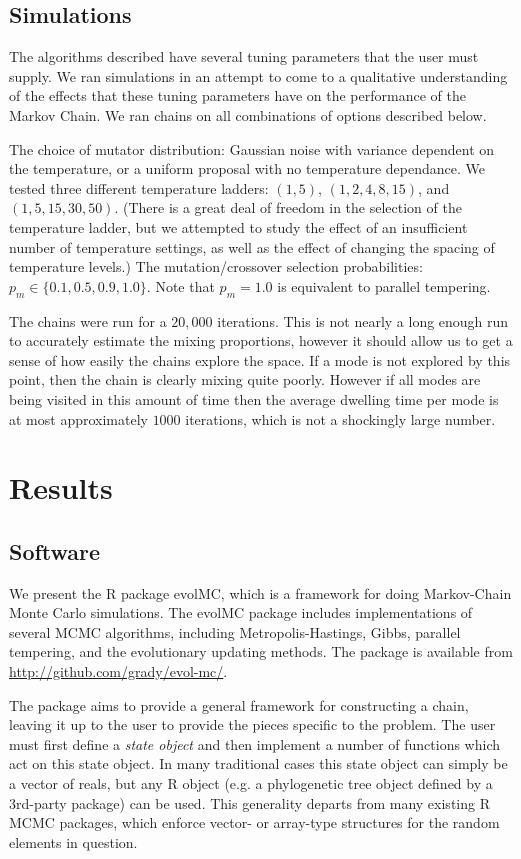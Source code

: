 \documentclass[12pt]{article}\usepackage[]{graphicx}\usepackage[]{color}
\begin{document}
\subsection{Simulations}
\label{sec:methods-simulations}
The algorithms described have several tuning parameters that the user
must supply. We ran simulations in an attempt to come to a qualitative
understanding of the effects that these tuning parameters have on the
performance of the Markov Chain. We ran chains on all combinations of
options described below.

The choice of mutator distribution: Gaussian noise with variance
dependent on the temperature, or a uniform proposal with no
temperature dependance.  We tested three different temperature
ladders: $(1,5)$, $(1,2, 4, 8, 15)$, and $(1,5,15,30,50)$. (There is a
great deal of freedom in the selection of the temperature ladder, but
we attempted to study the effect of an insufficient number of
temperature settings, as well as the effect of changing the spacing of
temperature levels.)  The mutation/crossover selection probabilities:
$p_m \in \{0.1, 0.5, 0.9, 1.0\}$. Note that $p_m = 1.0$ is equivalent to
parallel tempering.

The chains were run for a $20,000$ iterations. This is not nearly a
long enough run to accurately estimate the mixing proportions, however
it should allow us to get a sense of how easily the chains explore the
space. If a mode is not explored by this point, then the chain is
clearly mixing quite poorly. However if all modes are being visited in
this amount of time then the average dwelling time per mode is at most
approximately $1000$ iterations, which is not a shockingly large number.
\section{Results}
\label{sec:results}

\subsection{Software}
\label{sec:software}

We present the R package evolMC, which is a framework for doing
Markov-Chain Monte Carlo simulations. The evolMC package includes
implementations of several MCMC algorithms, including
Metropolis-Hastings, Gibbs, parallel tempering, and the evolutionary
updating methods. The package is available from
\url{http://github.com/grady/evol-mc/}.

The package aims to provide a general framework for constructing a
chain, leaving it up to the user to provide the pieces specific to the
problem. The user must first define a \emph{state object} and then
implement a number of functions which act on this state object. In
many traditional cases this state object can simply be a vector of
reals, but any R object (e.g. a phylogenetic tree object defined by a
3rd-party package) can be used. This generality departs from many
existing R MCMC packages, which enforce vector- or array-type
structures for the random elements in question.
\end{document}
